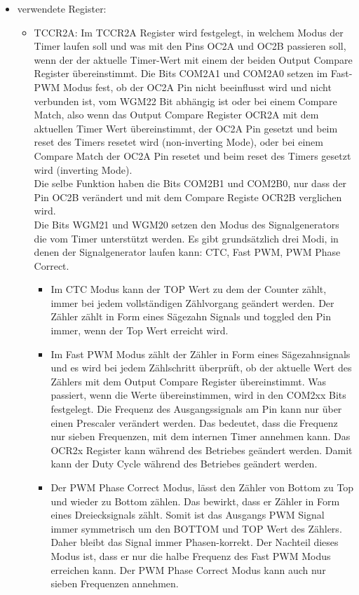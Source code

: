 \begin{itemize}
\item verwendete Register:
\begin{itemize}
\item TCCR2A: Im TCCR2A Register wird festgelegt, in welchem Modus der Timer laufen soll und was mit den Pins OC2A und OC2B passieren soll, wenn der der aktuelle Timer-Wert mit einem der beiden Output Compare Register übereinstimmt. Die Bits COM2A1 und COM2A0 setzen im Fast-PWM Modus fest, ob der OC2A Pin nicht beeinflusst wird und nicht verbunden ist, vom WGM22 Bit abhängig ist oder bei einem Compare Match, also wenn das Output Compare Register OCR2A mit dem aktuellen Timer Wert übereinstimmt, der OC2A Pin gesetzt und beim reset des Timers resetet wird (non-inverting Mode), oder bei einem Compare Match der OC2A Pin resetet und beim reset des Timers gesetzt wird (inverting Mode). \\ Die selbe Funktion haben die Bits COM2B1 und COM2B0, nur dass der Pin OC2B verändert und mit dem Compare Registe OCR2B verglichen wird. \\
Die Bits WGM21 und WGM20 setzen den Modus des Signalgenerators die vom Timer unterstützt werden. Es gibt grundsätzlich drei Modi, in denen der Signalgenerator laufen kann: CTC, Fast PWM, PWM Phase Correct. \\
\begin{itemize}
\item Im CTC Modus kann der TOP Wert zu dem der Counter zählt, immer bei jedem vollständigen Zählvorgang geändert werden. Der Zähler zählt in Form eines Sägezahn Signals und toggled den Pin immer, wenn der Top Wert erreicht wird.\\
\item Im Fast PWM Modus zählt der Zähler in Form eines Sägezahnsignals und es wird bei jedem Zählschritt überprüft, ob der aktuelle Wert des Zählers mit dem Output Compare Register übereinstimmt. Was passiert, wenn die Werte übereinstimmen, wird in den COM2xx Bits festgelegt. Die Frequenz des Ausgangssignals am Pin kann nur über einen Prescaler verändert werden. Das bedeutet, dass die Frequenz nur sieben Frequenzen, mit dem internen Timer annehmen kann. Das OCR2x Register kann während des Betriebes geändert werden. Damit kann der Duty Cycle während des Betriebes geändert werden. \\
\item Der PWM Phase Correct Modus, lässt den Zähler von Bottom zu Top und wieder zu Bottom zählen. Das bewirkt, dass er Zähler in Form eines Dreiecksignals zählt. Somit ist das Ausgangs PWM Signal immer symmetrisch um den BOTTOM und TOP Wert des Zählers. Daher bleibt das Signal immer Phasen-korrekt. Der Nachteil dieses Modus ist, dass er nur die halbe Frequenz des Fast PWM Modus erreichen kann. Der PWM Phase Correct Modus kann auch nur sieben Frequenzen annehmen.\\

\end{itemize}
\end{itemize}
\end{itemize}
